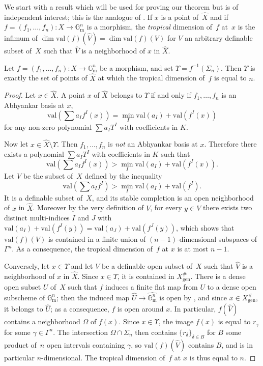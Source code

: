 \documentclass[JEP,XML,SOM,Unicode,ThmDefs,NoEqCountersInSection,published]{cedram}
\newcommand{\val}{\mathrm{val}}
\newcommand{\gm}{\bG_{\mathrm m}}
\newcommand{\bG}{\mathbb G}
\theoremstyle{plain}
\theoremstyle{definition}
\begin{document}
We start with a result which will be used for proving our theorem but
is of independent interest; this is the analogue of
\cite[Th.\,3.4(1)]{confluentes}. If $x$ is a point of~$\widehat X$ and if $f=(f_1,\ldots, f_n)\colon X\to \gm^n$
is a morphism, the \emph{tropical} dimension of~$f$ at~$x$ is the infimum of
$\dim \val (f) (\widehat V)=\dim \val (f)(V)$ for $V$ an arbitrary definable subset of~$X$
such that $\widehat V$ is a neighborhood of $x$ in $\widehat X$.

\begin{prop}\label{prop-dimtrop}
Let $f=(f_1,\ldots, f_n) \colon X\to \gm^n$ be a morphism,
and set $\Upsilon=f^{-1}(\Sigma_n)$. Then
$\Upsilon$ is exactly the set of points of $\widehat X$ at which the tropical dimension of~$f$
is equal to $n$.
\end{prop}

\begin{proof}
Let $x\in \widehat X$. A point $x$ of $\widehat X$ belongs to $\Upsilon$ if and only if
$f_1,\ldots, f_n$ is an Abhyankar basis at $x$, \ie
\[\val\left(\sum a_I f^I(x)\right) =\min_I \val (a_I)+\val (f^I(x))\]
for any non-zero polynomial $\sum a_I T^I$ with coefficients in $K$.

Now let $x\in \widehat X\setminus \Upsilon$. Then $f_1,\ldots, f_n$ is \emph{not}
an Abhyankar basis at $x$. Therefore there exists a polynomial $\sum a_I T^I$ with coefficients in $K$ such that
\[\val\left(\sum a_I f^I(x)\right) >\min_I \val (a_I)+\val (f^I(x)).\]
Let $V$ be the subset of~$X$ defined by the inequality
\[\val\left(\sum a_I f^I\right)>\min_I \val (a_I)+\val (f^I).\]
It is a definable subset of~$X$, and its stable completion is an open
neighborhood of $x$ in $\widehat X$.
Moreover by the very definition of $V$, for every $y\in V$ there exists two distinct
multi-indices $I$ and $J$ with $\val (a_I)+\val (f^I(y))=\val (a_J)+\val (f^J(y))$, which shows that
$\val (f) (V)$ is contained in a finite union of $(n-1)$-dimensional subspaces of $\Gamma^n$.
As a consequence, the tropical dimension of~$f$ at $x$ is at most $n-1$.

Conversely, let $x\in \Upsilon$ and let $V$ be a definable open subset of~$X$ such that $\widehat V$
is a neighborhood of $x$ in $\widehat X$.
Since $x\in \Upsilon$, it is contained in $X^\#_{\mathrm{gen}}$.
There is a dense open subset $U$ of~$X$ such that $f$ induces a finite flat map from $U$ to a dense
open subscheme of $\gm^n$; then the induced
map $\widehat U\to \widehat {\gm^n}$ is open
by \cite[Cor.\,9.7.2]{HL}, and since $x\in X^\#_{\mathrm{gen}}$, it belongs
to $\widehat U$; as a consequence, $f$
is open around $x$. In particular, $f(\widehat V)$ contains a neighborhood $\Omega$ of $f(x)$.
Since $x\in \Upsilon$, the image $f(x)$ is equal to $r_\gamma$ for some $\gamma \in \Gamma^n$.
The intersection $\Omega \cap \Sigma_n$ then contains $\{r_\delta\}_{\delta \in B}$ for $B$ some product of~$n$ open intervals
containing $\gamma$, so $\val (f)(\widehat V)$ contains $B$, and is in particular $n$\nobreakdash-dimen\-sional.
The tropical dimension of~$f$ at $x$ is thus equal to $n$.
\end{proof}
\end{document}
